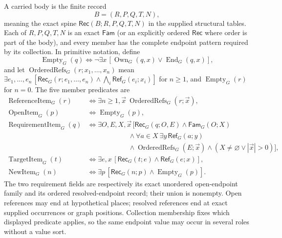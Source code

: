 \documentclass[11pt,twoside]{article}
\newcommand{\Rec}{\mathsf{Rec}}
\newcommand{\Fam}{\mathsf{Fam}}
\newcommand{\RefPos}{\mathsf{Ref}}
\begin{document}
A carried body is the finite record
\[
  B=(R,P,Q,T,N),
\]
meaning the exact spine \(\Rec(B;R,P,Q,T,N)\) in the supplied structural
tables.  Each of \(R,P,Q,T,N\) is an exact \(\Fam\) (or an explicitly ordered
\(\Rec\) where order is part of the body), and every member has the complete
endpoint pattern required by its collection.  In primitive notation, define
\[
 \operatorname{Empty}_G(q)\Longleftrightarrow
 \neg\exists x\,[\operatorname{Own}_G(q,x)\lor\operatorname{End}_G(q,x)],
\]
and let \(\operatorname{OrderedRefs}_G(r;x_1,\ldots,x_n)\) mean
\(\exists e_1,\ldots,e_n\,[\Rec_G(r;e_1,\ldots,e_n)\land
  \bigwedge_i\RefPos_G(e_i;x_i)]\) for \(n\ge1\), and
\(\operatorname{Empty}_G(r)\) for \(n=0\).  The five member predicates are
\[
\begin{aligned}
 \operatorname{ReferenceItem}_G(r)
  &\Longleftrightarrow
    \exists n\ge1,\vec x\ \operatorname{OrderedRefs}_G(r;\vec x),\\
 \operatorname{OpenItem}_G(p)
  &\Longleftrightarrow \operatorname{Empty}_G(p),\\
 \operatorname{RequirementItem}_G(q)
  &\Longleftrightarrow
    \exists O,E,X,\vec x\,[\Rec_G(q;O,E)
       \land\Fam_G(O;X)\\[-0.4em]
  &\hspace{6em}{}\land
    \forall a\in X\ \exists y\,\RefPos_G(a;y)
    \\[-0.4em]
  &\hspace{6em}{}\land\operatorname{OrderedRefs}_G(E;\vec x)
    \land(X\ne\varnothing\lor |\vec x|>0)],\\
 \operatorname{TargetItem}_G(t)
  &\Longleftrightarrow
    \exists e,x\,[\Rec_G(t;e)\land\RefPos_G(e;x)],\\
 \operatorname{NewItem}_G(n)
  &\Longleftrightarrow
    \exists p\,[\Rec_G(n;p)\land\operatorname{Empty}_G(p)].
\end{aligned}
\]
The two requirement fields are respectively its exact unordered open-endpoint
family and its ordered resolved-endpoint record; their union is nonempty.  Open references may end
at hypothetical places; resolved references end at exact supplied occurrences or
graph positions.  Collection membership fixes which displayed predicate applies,
so the same endpoint value may occur in several roles without a value sort.
\end{document}
